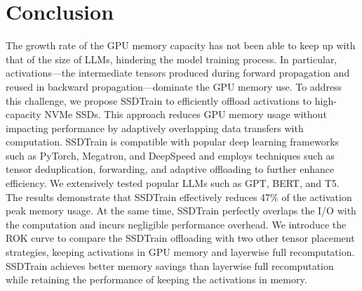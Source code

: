 \section{Conclusion}

The growth rate of the GPU memory capacity has not been able to keep up with that of the size of LLMs,
hindering the model training process. In particular, activations---the intermediate tensors produced during forward propagation and reused in backward propagation---dominate the GPU memory use. To address this challenge, we propose SSDTrain to efficiently offload activations to high-capacity NVMe SSDs. This approach reduces GPU memory usage without impacting performance by adaptively overlapping data transfers with computation. SSDTrain is compatible with popular deep learning frameworks such as PyTorch, Megatron, and DeepSpeed and employs techniques such as tensor deduplication, forwarding, and adaptive offloading to further enhance efficiency. We extensively tested popular LLMs such as GPT, BERT, and T5. The results demonstrate that SSDTrain effectively reduces 47\% of the activation peak memory usage. At the same time, SSDTrain perfectly overlaps the I/O with the computation and incurs negligible performance overhead. We introduce the ROK curve to compare the SSDTrain offloading with two other tensor placement strategies, keeping activations in GPU memory and layerwise full recomputation.  SSDTrain achieves better memory savings than layerwise full recomputation while retaining the performance of keeping the activations in memory. 

